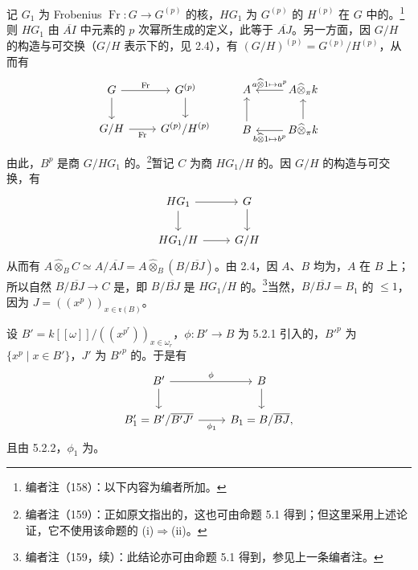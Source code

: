 记 $G_1$ 为 Frobenius  $\operatorname{Fr}:G\to G^{(p)}$ 的核，$HG_1$ 为 $G^{(p)}$ 的 $H^{(p)}$ 在 $G$ 中的。\footnote{编者注（158）：以下内容为编者所加。}则 $HG_1$ 由 $\overline{AI}$ 中元素的 $p$ 次幂所生成的定义，此等于 $\overline{AJ}$。另一方面，因 $G/H$ 的构造与可交换（$G/H$ 表示下的，见 2.4），有 $(G/H)^{(p)}=G^{(p)}/H^{(p)}$，从而有
\[
\begin{tikzcd}
G\arrow[r,"\operatorname{Fr}"]\arrow[d]&G^{(p)}\arrow[d]\\
G/H\arrow[r,"\operatorname{Fr}"']&G^{(p)}/H^{(p)}
\end{tikzcd}
\qquad
\begin{tikzcd}
A&A\widehat\otimes_\pi k\arrow[l,"{a\widehat\otimes1\mapsto a^p}"']\\
B\arrow[u]&B\widehat\otimes_\pi k\arrow[l,"{b\widehat\otimes1\mapsto b^p}"]\arrow[u]
\end{tikzcd}
\]
由此，$B^p$ 是商 $G/HG_1$ 的。\footnote{编者注（159）：正如原文指出的，这也可由命题 5.1 得到；但这里采用上述论证，它不使用该命题的 (i)$\Rightarrow$(ii)。}暂记 $C$ 为商 $HG_1/H$ 的。因 $G/H$ 的构造与可交换，有
\[
\begin{tikzcd}HG_1\arrow[r]\arrow[d]&G\arrow[d]\\HG_1/H\arrow[r]&G/H\end{tikzcd}
\]
从而有 $A\widehat\otimes_B C\simeq A/\overline{AJ}=A\widehat\otimes_B(B/\overline{BJ})$。由 2.4，因 $A$、$B$ 均为，$A$ 在 $B$ 上；
所以自然 $B/\overline{BJ}\to C$ 是，即 $B/\overline{BJ}$ 是 $HG_1/H$ 的。\footnote{编者注（159，续）：此结论亦可由命题 5.1 得到，参见上一条编者注。}当然，$B/\overline{BJ}=B_1$ 的 $\leq1$，因为 $J=((x^p))_{x\in\mathfrak r(B)}$。

设 $B'=k[[\omega]]/((x^{p^r}))_{x\in\omega_r}$，$\phi:B'\to B$ 为 5.2.1 引入的，$B'^p$ 为 $\{x^p\mid x\in B'\}$，$J'$ 为 $B'^p$ 的。于是有
\[
\begin{tikzcd}
B'\arrow[r,"\phi"]\arrow[d]&B\arrow[d]\\
B'_1=B'/\overline{B'J'}\arrow[r,"\phi_1"']&B_1=B/\overline{BJ},
\end{tikzcd}
\]
且由 5.2.2，$\phi_1$ 为。

